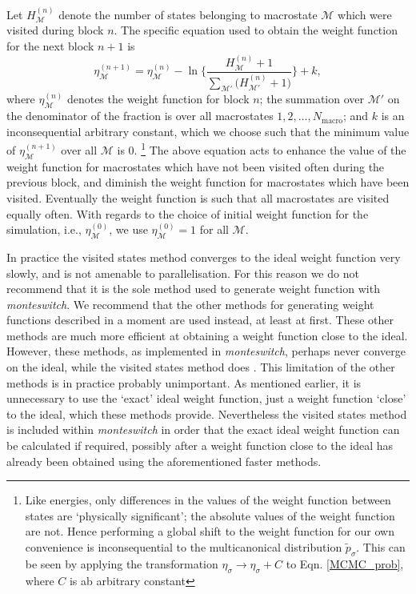 \documentclass{report}
\begin{document}
Let $H^{(n)}_{\mathcal{M}}$ denote the number of states belonging to macrostate $\mathcal{M}$ which were visited during block $n$.
The specific equation used to obtain the weight function for the next block $n+1$ is
\begin{equation}
\eta^{(n+1)}_{\mathcal{M}}=\eta^{(n)}_{\mathcal{M}}-\ln\Biggl\lbrace
\frac{H^{(n)}_{\mathcal{M}}+1}{\sum_{\mathcal{M}'}\bigl(H^{(n)}_{\mathcal{M}'}+1\bigr)}
\Biggr\rbrace
+k,
\end{equation}
where $\eta^{(n)}_{\mathcal{M}}$ denotes the weight function for block $n$; the summation over $\mathcal{M}'$ on the denominator of the fraction is
over all macrostates $1,2,\dotsc,N_{\text{macro}}$; and $k$ is an inconsequential arbitrary constant, which we choose such that the minimum value of 
$\eta^{(n+1)}_{\mathcal{M}}$ over all $\mathcal{M}$ is 0.
\footnote{Like energies, only differences in the values of the weight function between states are `physically significant'; the absolute values 
of the weight function are not. Hence performing a global shift to the weight function for our own convenience is inconsequential to the
multicanonical distribution $\tilde{p}_{\sigma}$. This can be seen by applying the transformation $\eta_{\sigma}\to\eta_{\sigma}+C$ to Eqn. \eqref{MCMC_prob},
where $C$ is ab arbitrary constant}
The above equation acts to enhance the value of the weight function for macrostates which have not been visited often during the previous block, and
diminish the weight function for macrostates which have been visited. Eventually the weight function is such that all macrostates are visited equally
often. 
With regards to the choice of initial weight function for the simulation, i.e., $\eta^{(0)}_{\mathcal{M}}$, we use $\eta^{(0)}_{\mathcal{M}}=1$
for all $\mathcal{M}$. 

In practice the visited states method converges to the ideal weight function very slowly, and is not amenable to parallelisation. 
For this reason we do not recommend that it is the sole method used to 
generate weight function with \emph{monteswitch}. We recommend that the other methods for generating weight functions described 
in a moment are used instead, at least at first. These other methods are much more efficient at obtaining a weight function close to the ideal. 
However, these methods, as implemented in \emph{monteswitch}, perhaps never converge on the ideal, while the visited states method does \cite{Smith_1995}. 
This limitation of the other methods is in practice probably
unimportant. As mentioned earlier, it is unnecessary to use the `exact' ideal weight function, just a weight function `close' to the ideal, which
these methods provide. Nevertheless the visited states method is included within \emph{monteswitch} in order that the exact ideal weight function can
be calculated if required, possibly after a weight function close to the ideal has already been obtained using the aforementioned faster methods.
\end{document}
